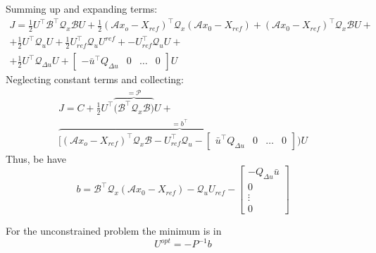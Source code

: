 \documentclass[a4paper,12pt,fleqn]{book}
\begin{document}
Summing up and expanding terms:
\begin{multline}
 J = 
 \frac{1}{2}U^\top \mathcal{B}^\top \mathcal{Q}_x \mathcal{B} U + 
 \frac{1}{2} (\mathcal{A}x_o - X_{ref})^\top \mathcal{Q}_x (\mathcal{A}x_0-X_{ref}) +
 (\mathcal{A}x_0 -X_{ref})^\top\mathcal{Q}_x \mathcal{B} U + \\
 + \frac{1}{2} U^\top \mathcal{Q}_u U +
 \frac{1}{2}U_{ref}^\top \mathcal{Q}_uU^{ref} + 
 -U_{ref}^\top\mathcal{Q}_u U +\\ 
 +\frac{1}{2} U^\top \mathcal{Q}_{\Delta u} U +
\begin{bmatrix}
  -{\bar u}^\top Q_{\Delta u} & 0 & \dots  & 0
 \end{bmatrix} U 
\end{multline}
Neglecting constant terms and collecting:
\begin{multline}
 J = C + \frac{1}{2} U^\top \overbrace{\big(\mathcal{B}^\top \mathcal{Q}_x \mathcal{B}\big)} ^{=\mathcal{P}}U + \\
 \overbrace{\bigg [(\mathcal{A}x_o - X_{ref})^\top \mathcal{Q}_x \mathcal{B} -U_{ref}^\top\mathcal{Q}_u -
 \begin{bmatrix}
  {\bar u}^\top Q_{\Delta u} & 0 & \dots  & 0
 \end{bmatrix}\bigg)}^{=b^\top} U
\end{multline}
Thus, be have
\begin{equation}
 b = \mathcal{B}^\top \mathcal{Q}_x(\mathcal{A}x_0 - X_{ref}) - \mathcal{Q}_uU_{ref} - 
  \begin{bmatrix}
 -Q_{\Delta u} \bar{u} \\ 0 \\ \vdots \\0
 \end{bmatrix}
\end{equation}

For the unconstrained problem the minimum is in 
\begin{equation}
 U^{opt} = -P^{-1}b
\end{equation}
\end{document}
